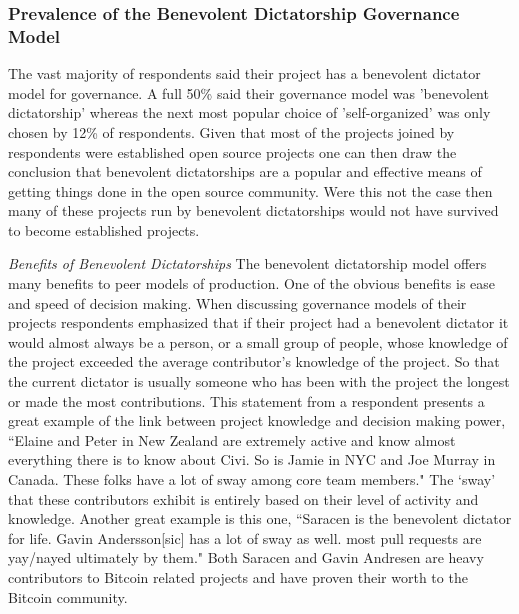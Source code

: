 \subsubsection{Prevalence of the Benevolent Dictatorship Governance Model}

The vast majority of respondents said their project has a benevolent dictator model for governance.  A full 50\% said their governance model was 'benevolent dictatorship' whereas the next most popular choice of 'self-organized' was only chosen by 12\% of respondents.  Given that most of the projects joined by respondents were established open source projects one can then draw the conclusion that benevolent dictatorships are a popular and effective means of getting things done in the open source community.  Were this not the case then many of these projects run by benevolent dictatorships would not have survived to become established projects.

{\it Benefits of Benevolent Dictatorships} The benevolent dictatorship model offers many benefits to peer models of production.  One of the obvious benefits is ease and speed of decision making.  When discussing governance models of their projects respondents emphasized that if their project had a benevolent dictator it would almost always be a person, or a small group of people, whose knowledge of the project exceeded the average contributor's knowledge of the project.  So that the current dictator is usually someone who has been with the project the longest or made the most contributions.  This statement from a respondent presents a great example of the link between project knowledge and decision making power, ``Elaine and Peter in New Zealand are extremely active and know almost everything there is to know about Civi. So is Jamie in NYC and Joe Murray in Canada. These folks have a lot of sway among core team members."  The `sway' that these contributors exhibit is entirely based on their level of activity and knowledge.  Another great example is this one, ``Saracen is the benevolent dictator for life. Gavin Andersson[sic] has a lot of sway as well. most pull requests are yay/nayed ultimately by them."  Both Saracen and Gavin Andresen are heavy contributors to Bitcoin related projects and have proven their worth to the Bitcoin community.

